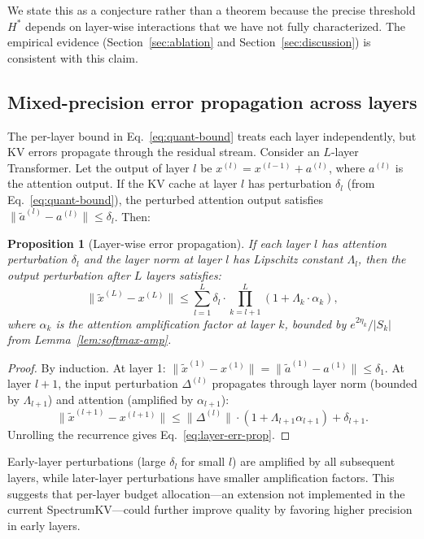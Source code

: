 \documentclass[11pt]{article}
\newcommand{\method}{SpectrumKV}
\theoremstyle{plain}
\newtheorem{proposition}{Proposition}
\theoremstyle{definition}
\begin{document}
We state this as a conjecture rather than a theorem because the precise threshold $H^*$ depends on layer-wise interactions that we have not fully characterized.  The empirical evidence (Section~\ref{sec:ablation} and Section~\ref{sec:discussion}) is consistent with this claim.

\subsection{Mixed-precision error propagation across layers}
\label{sec:layer-error}

The per-layer bound in Eq.~\eqref{eq:quant-bound} treats each layer independently, but KV errors propagate through the residual stream.  Consider an $L$-layer Transformer.  Let the output of layer $l$ be $x^{(l)} = x^{(l-1)} + a^{(l)}$, where $a^{(l)}$ is the attention output.  If the KV cache at layer $l$ has perturbation $\delta_l$ (from Eq.~\eqref{eq:quant-bound}), the perturbed attention output satisfies $\|\tilde a^{(l)} - a^{(l)}\| \le \delta_l$.  Then:

\begin{proposition}[Layer-wise error propagation]
\label{prop:layer-err}
If each layer $l$ has attention perturbation $\delta_l$ and the layer norm at layer $l$ has Lipschitz constant $\Lambda_l$, then the output perturbation after $L$ layers satisfies:
\begin{equation}
  \|\tilde x^{(L)} - x^{(L)}\| \le \sum_{l=1}^{L} \delta_l \cdot \prod_{k=l+1}^{L} (1 + \Lambda_k \cdot \alpha_k),
  \label{eq:layer-err-prop}
\end{equation}
where $\alpha_k$ is the attention amplification factor at layer $k$, bounded by $e^{2\eta_k}/|S_k|$ from Lemma~\ref{lem:softmax-amp}.
\end{proposition}
\begin{proof}
By induction.  At layer 1: $\|\tilde x^{(1)} - x^{(1)}\| = \|\tilde a^{(1)} - a^{(1)}\| \le \delta_1$.  At layer $l+1$, the input perturbation $\Delta^{(l)}$ propagates through layer norm (bounded by $\Lambda_{l+1}$) and attention (amplified by $\alpha_{l+1}$):
\[
  \|\tilde x^{(l+1)} - x^{(l+1)}\| \le \|\Delta^{(l)}\| \cdot (1 + \Lambda_{l+1} \alpha_{l+1}) + \delta_{l+1}.
\]
Unrolling the recurrence gives Eq.~\eqref{eq:layer-err-prop}.
\end{proof}

Early-layer perturbations (large $\delta_l$ for small $l$) are amplified by all subsequent layers, while later-layer perturbations have smaller amplification factors.  This suggests that per-layer budget allocation---an extension not implemented in the current \method{}---could further improve quality by favoring higher precision in early layers.
\end{document}

